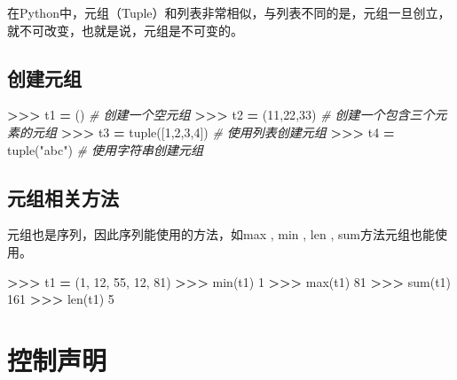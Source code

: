\documentclass[]{ctexbook}
\newenvironment{Shaded}{\begin{snugshade}}{\end{snugshade}}
\newcommand{\BuiltInTok}[1]{#1}
\newcommand{\CommentTok}[1]{\textcolor[rgb]{0.56,0.35,0.01}{\textit{#1}}}
\newcommand{\DecValTok}[1]{\textcolor[rgb]{0.00,0.00,0.81}{#1}}
\newcommand{\NormalTok}[1]{#1}
\newcommand{\OperatorTok}[1]{\textcolor[rgb]{0.81,0.36,0.00}{\textbf{#1}}}
\newcommand{\StringTok}[1]{\textcolor[rgb]{0.31,0.60,0.02}{#1}}
\begin{document}
在Python中，元组（Tuple）和列表非常相似，与列表不同的是，元组一旦创立，就不可改变，也就是说，元组是不可变的。

\hypertarget{ux521bux5efaux5143ux7ec4}{%
\subsection{创建元组}\label{ux521bux5efaux5143ux7ec4}}

\begin{Shaded}
\begin{Highlighting}[]
\OperatorTok{>>>}\NormalTok{ t1 }\OperatorTok{=}\NormalTok{ ()                 }\CommentTok{# 创建一个空元组}
\OperatorTok{>>>}\NormalTok{ t2 }\OperatorTok{=}\NormalTok{ (}\DecValTok{11}\NormalTok{,}\DecValTok{22}\NormalTok{,}\DecValTok{33}\NormalTok{)         }\CommentTok{# 创建一个包含三个元素的元组}
\OperatorTok{>>>}\NormalTok{ t3 }\OperatorTok{=} \BuiltInTok{tuple}\NormalTok{([}\DecValTok{1}\NormalTok{,}\DecValTok{2}\NormalTok{,}\DecValTok{3}\NormalTok{,}\DecValTok{4}\NormalTok{])   }\CommentTok{# 使用列表创建元组}
\OperatorTok{>>>}\NormalTok{ t4 }\OperatorTok{=} \BuiltInTok{tuple}\NormalTok{(}\StringTok{"abc"}\NormalTok{)       }\CommentTok{# 使用字符串创建元组}
\end{Highlighting}
\end{Shaded}

\hypertarget{ux5143ux7ec4ux76f8ux5173ux65b9ux6cd5}{%
\subsection{元组相关方法}\label{ux5143ux7ec4ux76f8ux5173ux65b9ux6cd5}}

元组也是序列，因此序列能使用的方法，如max , min , len , sum方法元组也能使用。

\begin{Shaded}
\begin{Highlighting}[]
\OperatorTok{>>>}\NormalTok{ t1 }\OperatorTok{=}\NormalTok{ (}\DecValTok{1}\NormalTok{, }\DecValTok{12}\NormalTok{, }\DecValTok{55}\NormalTok{, }\DecValTok{12}\NormalTok{, }\DecValTok{81}\NormalTok{)}
\OperatorTok{>>>} \BuiltInTok{min}\NormalTok{(t1)}
\DecValTok{1}
\OperatorTok{>>>} \BuiltInTok{max}\NormalTok{(t1)}
\DecValTok{81}
\OperatorTok{>>>} \BuiltInTok{sum}\NormalTok{(t1)}
\DecValTok{161}
\OperatorTok{>>>} \BuiltInTok{len}\NormalTok{(t1)}
\DecValTok{5}
\end{Highlighting}
\end{Shaded}

\hypertarget{ux63a7ux5236ux58f0ux660e}{%
\section{控制声明}\label{ux63a7ux5236ux58f0ux660e}}
\end{document}
